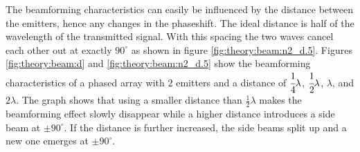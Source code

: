 The beamforming characteristics can easily be influenced by the distance between the emitters, hence any changes in the phaseshift.
The ideal distance is half of the wavelength of the transmitted signal. With this spacing the two waves cancel each other out at exactly $90^\circ$ as shown in figure \ref{fig:theory:beam:n2_d.5}.\p
%
Figures \ref{fig:theory:beam:d} and \ref{fig:theory:beam:n2_d.5} show the beamforming characteristics of a phased array with $2$ emitters and a distance of $\cfrac{1}{4}\lambda$, $\cfrac{1}{2}\lambda$, $\lambda$, and $2\lambda$. The graph shows that using a smaller distance than $\frac{1}{2} \lambda$ makes the beamforming effect slowly disappear while a higher distance introduces a side beam at $\pm 90^\circ$. If the distance is further increased, the side beams split up and a new one emerges at $\pm 90^\circ$.
%
